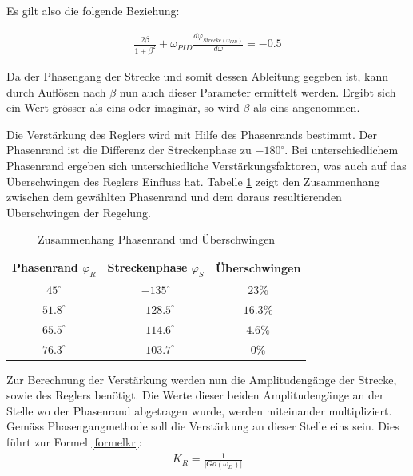 Es gilt also die folgende Beziehung:\newline

\begin{align}
\frac{2\beta}{1+\beta^2} + \omega_{PID}\frac{d\varphi_{Strecke(\omega_{PID})}}{d\omega} = -0.5
\end{align}\newline

Da der Phasengang der Strecke und somit dessen Ableitung gegeben ist, kann durch Auflösen nach $\beta$ nun auch dieser Parameter ermittelt werden. Ergibt sich ein Wert grösser als eins oder imaginär, so wird $\beta$ als eins angenommen.

Die Verstärkung des Reglers wird mit Hilfe des Phasenrands bestimmt. Der Phasenrand ist die Differenz der Streckenphase zu $-180^\circ$. Bei unterschiedlichem Phasenrand ergeben sich unterschiedliche Verstärkungsfaktoren, was auch auf das Überschwingen des Reglers Einfluss hat. Tabelle \ref{phasenrand} zeigt den Zusammenhang zwischen dem gewählten Phasenrand und dem daraus resultierenden Überschwingen der Regelung.\newline


\begin{table}[h]
\centering
\renewcommand*{\arraystretch}{1.2}
\begin{tabular}{|c|c|c|}
\hline 
\textbf{Phasenrand $\varphi_R$} & \textbf{Streckenphase $\varphi_S$} & \textbf{Überschwingen} \\ 
\hline 
$45^\circ$ & $-135^\circ$ & $23\%$ \\ 
\hline 
$51.8^\circ$ & $-128.5^\circ$ & $16.3\%$ \\ 
\hline 
 $65.5^\circ$& $-114.6^\circ$ & $4.6\%$ \\ 
\hline 
$76.3^\circ$ & $-103.7^\circ$ & $0\%$ \\ 
\hline
\end{tabular} 
\caption{Zusammenhang Phasenrand und Überschwingen}
\label{phasenrand}
\renewcommand*{\arraystretch}{1}
\end{table}

\newpage
Zur Berechnung der Verstärkung werden nun die Amplitudengänge der Strecke, sowie des Reglers benötigt. Die Werte dieser beiden Amplitudengänge an der Stelle wo der Phasenrand abgetragen wurde, werden miteinander multipliziert. Gemäss Phasengangmethode soll die Verstärkung an dieser Stelle eins sein. Dies führt zur Formel \ref{formelkr}:\newline
\begin{align}
K_R=\frac{1}{\vert{Go(\omega_D)}\vert{}}
\label{formelkr}
\end{align}


